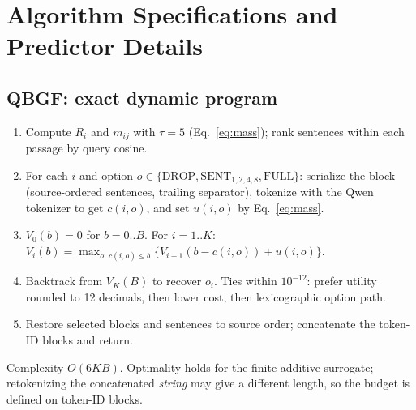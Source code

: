 \documentclass[10pt,twocolumn,letterpaper]{article}
\begin{document}
\appendix
\setlength{\parskip}{2.3pt}
\setlength{\parindent}{0pt}
\captionsetup{font=small,skip=4pt}
\section{Algorithm Specifications and Predictor Details}\label{app:alg}
\subsection{QBGF: exact dynamic program}
\begin{apbox}[title={Algorithm A1: QBGF allocation (input: passages $p_{1..K}$, query, budget $B$)}]
\begin{enumerate}
\item Compute $R_i$ and $m_{ij}$ with $\tau{=}5$ (Eq.~\ref{eq:mass}); rank sentences within each passage by query cosine.
\item For each $i$ and option $o\in\{\mathrm{DROP},\mathrm{SENT}_{1,2,4,8},\mathrm{FULL}\}$: serialize the block (source-ordered sentences, trailing separator), tokenize with the Qwen tokenizer to get $c(i,o)$, and set $u(i,o)$ by Eq.~\ref{eq:mass}.
\item $V_0(b){=}0$ for $b{=}0..B$. For $i{=}1..K$: $V_i(b)=\max_{o:\,c(i,o)\le b}\{V_{i-1}(b-c(i,o))+u(i,o)\}$.
\item Backtrack from $V_K(B)$ to recover $o_i$. Ties within $10^{-12}$: prefer utility rounded to 12 decimals, then lower cost, then lexicographic option path.
\item Restore selected blocks and sentences to source order; concatenate the token-ID blocks and return.
\end{enumerate}
Complexity $O(6KB)$. Optimality holds for the finite additive surrogate; retokenizing the concatenated \emph{string} may give a different length, so the budget is defined on token-ID blocks.
\end{apbox}
\end{document}
